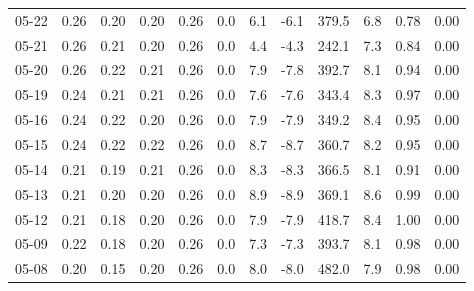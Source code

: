 \begin{threeparttable}
{\begin{tabular}{lrrrrrrrrrrr}
  05-22 &          0.26 &          0.20 &          0.20 &        0.26 &                 0.0 &                 6.1 &       -6.1 &               379.5 &              6.8 &            0.78 &                   0.00 \\
  05-21 &          0.26 &          0.21 &          0.20 &        0.26 &                 0.0 &                 4.4 &       -4.3 &               242.1 &              7.3 &            0.84 &                   0.00 \\
  05-20 &          0.26 &          0.22 &          0.21 &        0.26 &                 0.0 &                 7.9 &       -7.8 &               392.7 &              8.1 &            0.94 &                   0.00 \\
  05-19 &          0.24 &          0.21 &          0.21 &        0.26 &                 0.0 &                 7.6 &       -7.6 &               343.4 &              8.3 &            0.97 &                   0.00 \\
  05-16 &          0.24 &          0.22 &          0.20 &        0.26 &                 0.0 &                 7.9 &       -7.9 &               349.2 &              8.4 &            0.95 &                   0.00 \\
  05-15 &          0.24 &          0.22 &          0.22 &        0.26 &                 0.0 &                 8.7 &       -8.7 &               360.7 &              8.2 &            0.95 &                   0.00 \\
  05-14 &          0.21 &          0.19 &          0.21 &        0.26 &                 0.0 &                 8.3 &       -8.3 &               366.5 &              8.1 &            0.91 &                   0.00 \\
  05-13 &          0.21 &          0.20 &          0.20 &        0.26 &                 0.0 &                 8.9 &       -8.9 &               369.1 &              8.6 &            0.99 &                   0.00 \\
  05-12 &          0.21 &          0.18 &          0.20 &        0.26 &                 0.0 &                 7.9 &       -7.9 &               418.7 &              8.4 &            1.00 &                   0.00 \\
  05-09 &          0.22 &          0.18 &          0.20 &        0.26 &                 0.0 &                 7.3 &       -7.3 &               393.7 &              8.1 &            0.98 &                   0.00 \\
  05-08 &          0.20 &          0.15 &          0.20 &        0.26 &                 0.0 &                 8.0 &       -8.0 &               482.0 &              7.9 &            0.98 &                   0.00 \\

\end{tabular}}
\end{threeparttable}
